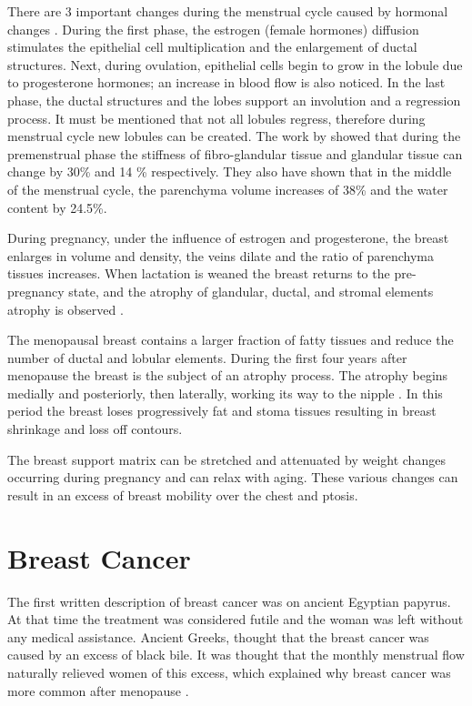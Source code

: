 There are 3 important changes during the menstrual cycle caused by hormonal changes \citep{andolina2011mammographic}. During the first phase, the estrogen (female hormones) diffusion stimulates the epithelial cell multiplication and the enlargement of ductal structures. Next, during ovulation, epithelial cells begin to grow in the lobule due to progesterone hormones; an increase in blood flow is also noticed. In the last phase, the ductal structures and the lobes support an involution and a regression process. It must be mentioned that not all lobules regress, therefore during menstrual cycle new lobules can be created.   The work by \cite{lorenzen_menstrual-cycle_2003} showed that during the premenstrual phase the stiffness of fibro-glandular tissue and glandular tissue can change by 30\% and 14 \% respectively. They also have shown that in the middle of the menstrual cycle, the parenchyma volume increases of 38\% and the water content by 24.5\%.

During pregnancy, under the influence of estrogen and progesterone, the breast enlarges in volume and density, the veins dilate and the ratio of parenchyma tissues increases.  When lactation is weaned the breast returns to the pre-pregnancy state, and the atrophy of glandular, ductal, and stromal elements atrophy is observed \citep{pandya_breast_2011}.

The menopausal breast contains a larger fraction of fatty tissues and reduce the number of ductal and lobular elements. During the first four years after menopause the breast is the subject of an atrophy process. The atrophy begins medially and posteriorly, then laterally, working its way to the nipple \citep{andolina2011mammographic}. In this period the breast loses progressively fat and stoma tissues resulting in breast shrinkage and loss off contours.

 The breast support matrix can be stretched and attenuated by weight changes occurring during pregnancy and can relax with aging. These various changes can result in an excess of breast mobility over the chest and ptosis. 

\section{Breast Cancer}\label{section:breastcancer}

The first written description of breast cancer was on ancient Egyptian papyrus. At that time the treatment was considered futile and the woman was left without any medical assistance. Ancient Greeks, thought that the breast cancer was caused by an excess of black bile. It was thought that the monthly menstrual flow naturally relieved women of this excess, which explained why breast cancer was more common after menopause \citep{andolina2011mammographic}.


